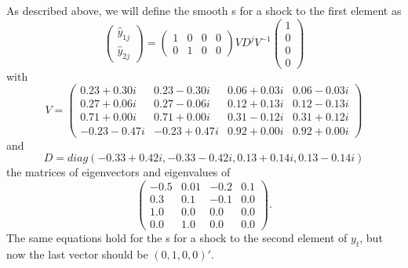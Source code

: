 \documentclass[12pt,fleqn]{article}
\begin{document}
As described above, we will define the smooth \IRF s for a shock to
the first element as
\begin{equation*}
  \begin{pmatrix}
    \hat y_{1j} \\ \hat y_{2j}
  \end{pmatrix}
  =
  \begin{pmatrix}
    1 & 0 & 0 & 0 \\ 0 & 1 & 0 & 0
  \end{pmatrix}
  V D^j V^{-1}
  \begin{pmatrix}
    1 \\ 0 \\ 0 \\ 0
  \end{pmatrix}
\end{equation*}
with
\begin{equation}
V = \begin{pmatrix}
     0.23 + 0.30 i & 0.23 - 0.30 i  & 0.06 + 0.03 i & 0.06 - 0.03 i \\
     0.27 + 0.06 i & 0.27 - 0.06 i  & 0.12 + 0.13 i & 0.12 - 0.13 i \\
     0.71 + 0.00 i & 0.71 + 0.00 i  & 0.31 - 0.12 i & 0.31 + 0.12 i \\
    -0.23 - 0.47 i & -0.23 + 0.47 i & 0.92 + 0.00 i & 0.92 + 0.00 i
  \end{pmatrix}
\end{equation}
and
\begin{equation}
  D = diag(-0.33 + 0.42 i, -0.33 - 0.42 i, 0.13 + 0.14 i, 0.13 - 0.14 i)
\end{equation}
the matrices of eigenvectors and eigenvalues of
\begin{equation*}
  \begin{pmatrix}
   -0.5            &  0.01          & -0.2          & 0.1          \\
    0.3            &  0.1           & -0.1          & 0.0          \\
    1.0            &  0.0           &  0.0          & 0.0          \\
    0.0            &  1.0           &  0.0          & 0.0
  \end{pmatrix}.
\end{equation*}
The same equations hold for the \IRF s for a shock to the second
element of $y_t$, but now the last vector should be $(0, 1, 0, 0)'$.
\end{document}
